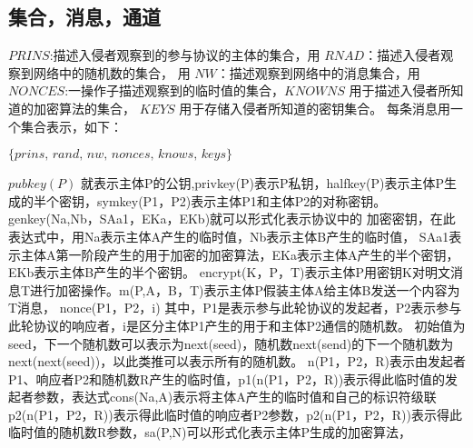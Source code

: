 \documentclass[UTF8]{ctexart}
\begin{document}
		\subsection{集合，消息，通道}
	\par{$PRINS$:描述入侵者观察到的参与协议的主体的集合，用 $RNAD$：描述入侵者观察到网络中的随机数的集合，
    用 $NW$：描述观察到网络中的消息集合，用 $NONCES$:一操作子描述观察到的临时值的集合，$KNOWNS$
    用于描述入侵者所知道的加密算法的集合， $KEYS$ 用于存储入侵者所知道的密钥集合。
    每条消息用一个集合表示，如下：
    \begin{center}
        $ \{prins, \, rand,\, nw, \, nonces,\, knows,\, keys \}$
	\end{center}

    $pubkey(P)$ 就表示主体P的公钥,privkey(P)表示P私钥，halfkey(P)表示主体P生成的半个密钥，symkey(P1，P2)表示主体P1和主体P2的对称密钥。
    genkey(Na,Nb，SAa1，EKa，EKb)就可以形式化表示协议中的 加密密钥，在此表达式中，用Na表示主体A产生的临时值，Nb表示主体B产生的临时值，
    SAa1表示主体A第一阶段产生的用于加密的加密算法，EKa表示主体A产生的半个密钥，EKb表示主体B产生的半个密钥。
    encrypt(K，P，T)表示主体P用密钥K对明文消息T进行加密操作。m(P,A，B，T)表示主体P假装主体A给主体B发送一个内容为T消息，
    nonce(P1，P2，i) 其中，P1是表示参与此轮协议的发起者，P2表示参与此轮协议的响应者，i是区分主体P1产生的用于和主体P2通信的随机数。
初始值为seed，下一个随机数可以表示为next(seed)，随机数next(send)的下一个随机数为next(next(seed))，以此类推可以表示所有的随机数。
n(P1，P2，R)表示由发起者P1、响应者P2和随机数R产生的临时值，p1(n(P1，P2，R))表示得此临时值的发起者参数，表达式cons(Na,A)表示将主体A产生的临时值和自己的标识符级联
p2(n(P1，P2，R))表示得此临时值的响应者P2参数，p2(n(P1，P2，R))表示得此临时值的随机数R参数，sa(P,N)可以形式化表示主体P生成的加密算法，

}
\end{document}
